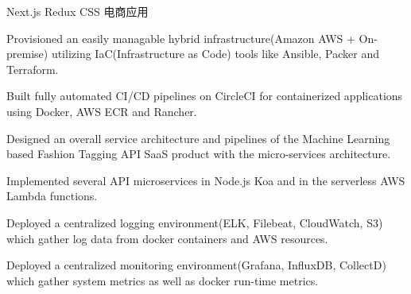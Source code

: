 \begin{cventries}

    \cventry
      {Next.js Redux CSS} %
      {电商应用} %
      {} %
      {} %
      {
        \begin{cvitems} %
          \item {Provisioned an easily managable hybrid infrastructure(Amazon AWS + On-premise) utilizing IaC(Infrastructure as Code) tools like Ansible, Packer and Terraform.}
          \item {Built fully automated CI/CD pipelines on CircleCI for containerized applications using Docker, AWS ECR and Rancher.}
          \item {Designed an overall service architecture and pipelines of the Machine Learning based Fashion Tagging API SaaS product with the micro-services architecture.}
          \item {Implemented several API microservices in Node.js Koa and in the serverless AWS Lambda functions.}
          \item {Deployed a centralized logging environment(ELK, Filebeat, CloudWatch, S3) which gather log data from docker containers and AWS resources.}
          \item {Deployed a centralized monitoring environment(Grafana, InfluxDB, CollectD) which gather system metrics as well as docker run-time metrics.}
        \end{cvitems}
      }
  
  \end{cventries}
